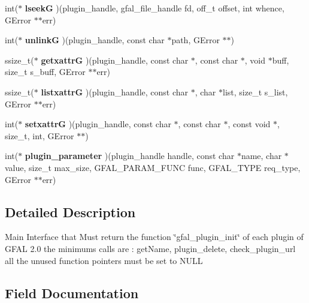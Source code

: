 \begin{CompactItemize}
\item 
int($\ast$ \textbf{lseek\-G} )(plugin\_\-handle, gfal\_\-file\_\-handle fd, off\_\-t offset, int whence, GError $\ast$$\ast$err)\label{struct__gfal__plugin__interface_424d4d77e29e5e4cfe92eae0d6a8bdc2}

\item 
int($\ast$ \textbf{unlink\-G} )(plugin\_\-handle, const char $\ast$path, GError $\ast$$\ast$)\label{struct__gfal__plugin__interface_75692c1e9487ff9ed7fce15dc2ddac62}

\item 
ssize\_\-t($\ast$ \textbf{getxattr\-G} )(plugin\_\-handle, const char $\ast$, const char $\ast$, void $\ast$buff, size\_\-t s\_\-buff, GError $\ast$$\ast$err)\label{struct__gfal__plugin__interface_9c6b4405f17d92e42aa40ff307188701}

\item 
ssize\_\-t($\ast$ \textbf{listxattr\-G} )(plugin\_\-handle, const char $\ast$, char $\ast$list, size\_\-t s\_\-list, GError $\ast$$\ast$err)\label{struct__gfal__plugin__interface_c3bae2e54ce8998722f03b588d423b18}

\item 
int($\ast$ \textbf{setxattr\-G} )(plugin\_\-handle, const char $\ast$, const char $\ast$, const void $\ast$, size\_\-t, int, GError $\ast$$\ast$)\label{struct__gfal__plugin__interface_2ededf4f6bc7f284ac31234110ee1444}

\item 
int($\ast$ \textbf{plugin\_\-parameter} )(plugin\_\-handle handle, const char $\ast$name, char $\ast$value, size\_\-t max\_\-size, GFAL\_\-PARAM\_\-FUNC func, GFAL\_\-TYPE req\_\-type, GError $\ast$$\ast$err)\label{struct__gfal__plugin__interface_4a4be363e714afa487e8abc21dce2ae7}

\end{CompactItemize}


\subsection{Detailed Description}
Main Interface that Must return the function \char`\"{}gfal\_\-plugin\_\-init\char`\"{} of each plugin of GFAL 2.0 the minimums calls are : get\-Name, plugin\_\-delete, check\_\-plugin\_\-url all the unused function pointers must be set to NULL 



\subsection{Field Documentation}
